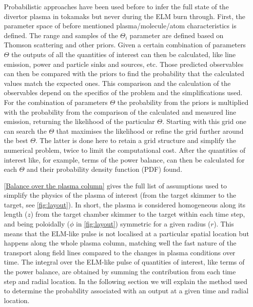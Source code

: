 Probabilistic approaches have been used before to infer the full state of the divertor plasma in tokamaks but never during the ELM burn through. \cite{Verhaegh2017,Verhaegh2020,Bowman2020} First, the parameter space of before mentioned plasma/molecule/atom characteristics is defined. The range and samples of the $\Theta_i$ parameter are defined based on Thomson scattering and other priors. Given a certain combination of parameters $\Theta$ the outputs of all the quantities of interest can then be calculated, like line emission, power and particle sinks and sources, etc. Those predicted observables can then be compared with the priors to find the probability that the calculated values match the expected ones. This comparison and the calculation of the observables depend on the specifics of the problem and the simplifications used. For the combination of parameters $\Theta$ the probability from the priors is multiplied with the probability from the comparison of the calculated and measured line emission, returning the likelihood of the particular $\Theta$. Starting with this grid one can search the $\Theta$ that maximises the likelihood or refine the grid further around the best $\Theta$. The latter is done here to retain a grid structure and simplify the numerical problem, twice to limit the computational cost. After the quantities of interest like, for example, terms of the power balance, can then be calculated for each $\Theta$ and their probability density function (PDF) found.


\autoref{Balance over the plasma column} gives the full list of assumptions used to simplify the physics of the plasma of interest (from the target skimmer to the target, see \autoref{fig:layout}). In short, the plasma is considered homogeneous along its length ($z$) from the target chamber skimmer to the target within each time step, and being poloidally ($\phi$ in \autoref{fig:layout}) symmetric for a given radius ($r$). This means that the ELM-like pulse is not localised at a particular spatial location but happens along the whole plasma column, matching well the fast nature of the transport along field lines compared to the changes in plasma conditions over time. The integral over the ELM-like pulse of quantities of interest, like terms of the power balance, are obtained by summing the contribution from each time step and radial location. In the following section we will explain the method used to determine the probability associated with an output at a given time and radial location.

